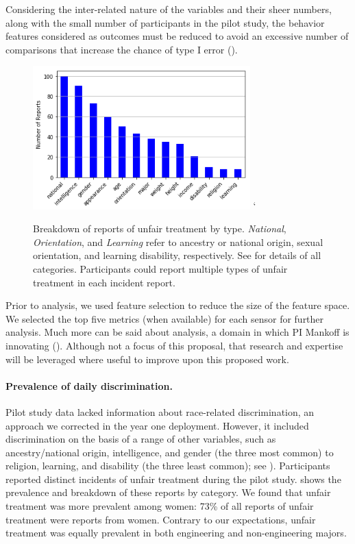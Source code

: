 Considering the inter-related nature of the variables and their sheer numbers, along with the small number of participants in the pilot study, the behavior features considered as outcomes must be reduced to avoid an excessive number of comparisons that increase the chance of type I error (). 
\begin{figure}
\vspace{-1.5em}
    \centering
    \includegraphics[width=3.3in]{img/discrimination_breakdown.png}
`    \caption[Unfair treatment type breakdown]{Breakdown of \numdiscriminationeventsfinal reports of unfair treatment by type. \textit{National}, \textit{Orientation}, and \textit{Learning} refer to ancestry or national origin, sexual orientation, and learning disability, respectively. See  for details of all categories. Participants could report multiple types of unfair treatment in each incident report.
}
    \label{fig:data-discrimination-breakdown}
\end{figure}
Prior to analysis, we used feature selection to reduce the size of the feature space. We selected the top five metrics (when available) for each sensor for further analysis. Much more can be said about analysis, a domain in which PI Mankoff is innovating (\eg \cite{DBLP:conf/huc/EarlyFM16,DBLP:conf/chi/BanovicBCMD16,DBLP:conf/huc/KoehlerBOMD14}). Although not a focus of this proposal, that research and expertise will be leveraged where useful to improve upon this proposed work.

\paragraph{Prevalence of daily discrimination.}
Pilot study data lacked information about race-related discrimination, an approach we corrected in the year one deployment. However, it included discrimination on the basis of a range of other variables, such as ancestry/national origin, intelligence, and gender (the three most common) to religion, learning, and disability (the three least common); see ). Participants reported \numdiscriminationeventsfinal distinct incidents of unfair treatment during the pilot study.  shows the prevalence and breakdown of these reports by category. We found that unfair treatment was more prevalent among women: 73\% of all reports of unfair treatment were reports from women. Contrary to our expectations, unfair treatment was equally prevalent in both engineering and non-engineering majors. 


